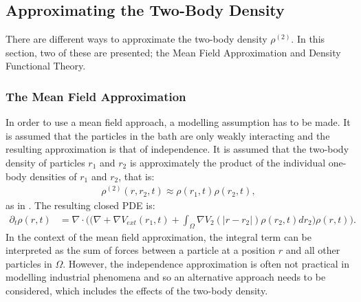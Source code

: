 \subsection{Approximating the Two-Body Density}
There are different ways to approximate the two-body density $\rho^{(2)}$. In this section, two of these are presented; the Mean Field Approximation and Density Functional Theory.
\subsubsection{The Mean Field Approximation}
In order to use a mean field approach, a modelling assumption has to be made. It is assumed that the particles in the bath are only weakly interacting and the resulting approximation is that of independence. It is assumed that the two-body density of particles $r_1$ and $r_2$ is approximately the product of the individual one-body densities of $r_1$ and $r_2$, that is:
\begin{align*}
\rho^{(2)}(r,r_2,t)\approx \rho(r_1,t)\rho(r_2,t),
\end{align*}
as in \cite{RexLoewen1}.
The resulting closed PDE is:
\begin{align}\label{eqnMeanFieldApprox1}
\partial_t \rho(r,t) &=
\nabla\cdot \bigg( \bigg(\nabla 
+ \nabla V_{ext}(r_1,t) 
+\int_\Omega  \nabla  V_2(|r - r_2|) \rho(r_2,t) dr_2 \bigg) \rho(r,t) \bigg).
\end{align}
In the context of the mean field approximation, the integral term can be interpreted as the sum of forces between a particle at a position $r$ and all other particles in $\Omega$.
However, the independence approximation is often not practical in modelling industrial phenomena and so an alternative approach needs to be considered, which includes the effects of the two-body density.
